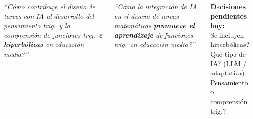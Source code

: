 \documentclass[11pt, aspectratio=169, spanish]{beamer}
\newcommand{\semNO}{\textcolor{RojoAlerta}{\faTimesCircle}}
\newcommand{\kwT}[1]{{\setlength{\fboxsep}{1.8pt}\colorbox{AzulInfo!18}{#1}}}        %
\newcommand{\kwM}[1]{{\setlength{\fboxsep}{1.8pt}\colorbox{VerdeUNAL!18}{#1}}}       %
\newcommand{\kwI}[1]{{\setlength{\fboxsep}{1.8pt}\colorbox{MoradoMarco!18}{#1}}}     %
\newcommand{\kwE}[1]{{\setlength{\fboxsep}{1.8pt}\colorbox{AmarilloAv!24}{#1}}}      %
\begin{document}
\begin{frame}[plain]
\begin{columns}[T]

\begin{tcolorbox}[colback=NaranjaPend!7, colframe=NaranjaPend!55, arc=2mm,
  nobeforeafter, top=2pt, bottom=2pt,
  title={\footnotesize\textbf{\faRedo\quad Versión actual}}]
{\scriptsize\textit{``\textquestiondown{}Cómo contribuye el \kwT{diseño de tareas} con \kwI{IA} al desarrollo del \kwM{pensamiento trig.}\ y la comprensión de \kwM{funciones trig.}\ \textbf{e hiperbólicas} en \kwE{educación media}?''}}
\end{tcolorbox}

\begin{tcolorbox}[colback=VerdeOk!7, colframe=VerdeOk!55, arc=2mm,
  nobeforeafter, top=2pt, bottom=2pt,
  title={\footnotesize\textbf{\faArrowRight\quad Propuesta revisada (Santacruz)}}]
{\scriptsize\textit{``\textquestiondown{}Cómo la integración de \kwI{IA} en el \kwT{diseño de tareas matemáticas} \textbf{promueve el \kwE{aprendizaje}} de \kwM{funciones trig.}\ en \kwE{educación media}?''}}
\end{tcolorbox}

\begin{tcolorbox}[colback=GrisFondo, colframe=GrisClaro, arc=1.5mm, nobeforeafter, top=2pt, bottom=2pt]
{\scriptsize\faTasks\;\textbf{Decisiones pendientes hoy:}\\
\semNO\; \textquestiondown{}Se incluyen hiperbólicas?\\
\semNO\; \textquestiondown{}Qué tipo de IA? (LLM / adaptativa)\\
\semNO\; \textquestiondown{}Pensamiento o comprensión trig.?}
\end{tcolorbox}

\end{columns}
\end{frame}
\end{document}

